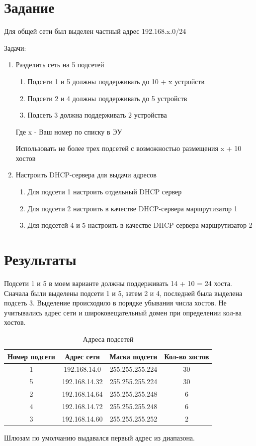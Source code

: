 \documentclass[12pt, a4paper]{extarticle}
\begin{document}

\section{Задание}

Для общей сети был выделен частный адрес 192.168.x.0/24

Задачи:
\begin{enumerate}
\item Разделить сеть на 5 подсетей
	 \begin{enumerate}
	\item Подсети 1 и 5 должны поддерживать до 10 +  x устройств
	\item Подсети 2 и 4 должны поддерживать до 5 устройств
	\item Подсеть 3 должна поддерживать 2 устройства
	\end{enumerate}

	Где x - Ваш номер по списку в ЭУ

	Использовать не более трех подсетей с возможностью размещения x + 10 хостов

\item Настроить  DHCP-сервера для выдачи адресов
 	\begin{enumerate}
	\item Для подсети 1 настроить отдельный DHCP сервер	
	\item Для подсети 2 настроить в качестве DHCP-сервера маршрутизатор 1
	\item Для подсетей 4 и 5 настроить в качестве DHCP-сервера маршрутизатор 2
	\end{enumerate}
\end{enumerate}

\section{Результаты}
Подсети 1 и 5 в моем варианте должны поддерживать 14 + 10 = 24 хоста. \\
Сначала были выделены подсети 1 и 5, затем 2 и 4, последней была выделена подсеть 3. Выделение происходило в порядке убывания числа хостов. Не учитывались адрес сети и широковещательный домен при определении кол-ва хостов.
\begin{table}[H]
	\centering
	\caption{Адреса подсетей}
	\begin{tabular}{| c |  c | c | c |}
	\hline
	Номер подсети & Адрес сети & Маска подсети & Кол-во хостов \\ \hline
	1 & 192.168.14.0 & 255.255.255.224 & 30 \\ \hline
	5 & 192.168.14.32 & 255.255.255.224  & 30 \\ \hline
	2 & 192.168.14.64 & 255.255.255.248 & 6 \\ \hline
	4 & 192.168.14.72 & 255.255.255.248 & 6 \\ \hline
	3 & 192.168.14.60 & 255.255.255.252 & 2 \\
	\hline
	\end{tabular}
\end{table}
Шлюзам по умолчанию выдавался первый адрес из диапазона.
\end{document}

